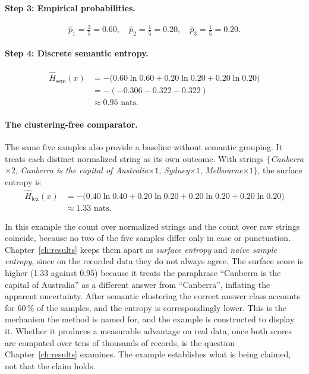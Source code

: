 \paragraph{Step 3: Empirical probabilities.}
\[
  \hat{p}_1 = \tfrac{3}{5} = 0.60,\quad
  \hat{p}_2 = \tfrac{1}{5} = 0.20,\quad
  \hat{p}_3 = \tfrac{1}{5} = 0.20.
\]

\paragraph{Step 4: Discrete semantic entropy.}
\begin{align*}
  \widehat{H}_{\mathrm{sem}}(x)
  &= -\bigl(0.60\ln 0.60 + 0.20\ln 0.20 + 0.20\ln 0.20\bigr) \\
  &= -(-0.306 - 0.322 - 0.322) \\
  &\approx 0.95 \text{ nats.}
\end{align*}

\paragraph{The clustering-free comparator.}
The same five samples also provide a baseline without semantic grouping. It
treats each distinct normalized string as its own outcome. With strings
$\{$\emph{Canberra}$\times 2$, \emph{Canberra is the capital of
Australia}$\times 1$, \emph{Sydney}$\times 1$, \emph{Melbourne}$\times 1\}$,
the surface entropy is
\begin{align*}
  \widehat{H}_{\mathrm{lex}}(x)
  &= -\bigl(0.40\ln 0.40 + 0.20\ln 0.20 + 0.20\ln 0.20 + 0.20\ln 0.20\bigr) \\
  &\approx 1.33 \text{ nats.}
\end{align*}

In this example the count over normalized strings and the count over raw
strings coincide, because no two of the five samples differ only in case or
punctuation. Chapter~\ref{ch:results} keeps them apart as \emph{surface
entropy} and \emph{naive sample entropy}, since on the recorded data they do
not always agree. The surface score is higher (1.33 against 0.95) because it treats the
paraphrase ``Canberra is the capital of Australia'' as a different answer
from ``Canberra'', inflating the apparent uncertainty. After semantic
clustering the correct answer class accounts for 60\,\% of the samples, and
the entropy is correspondingly lower. This is the mechanism the method is
named for, and the example is constructed to display it. Whether it produces a
measurable advantage on real data, once both scores are computed over tens of
thousands of records, is the question Chapter~\ref{ch:results} examines.
The example establishes what is being claimed, not that the claim holds.

